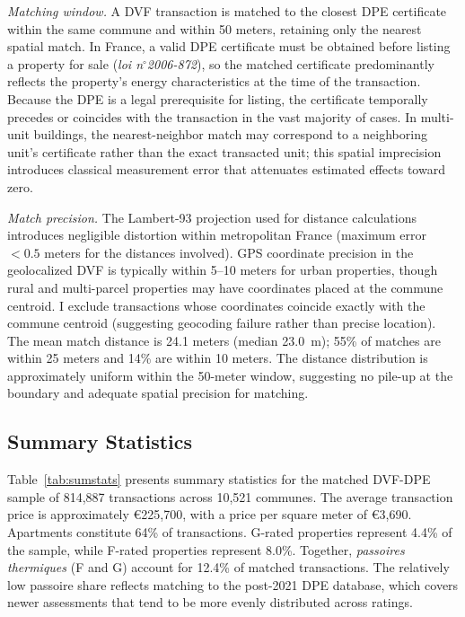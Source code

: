 \documentclass[12pt]{article}
\begin{document}
\textit{Matching window.} A DVF transaction is matched to the closest DPE certificate within the same commune and within 50 meters, retaining only the nearest spatial match. In France, a valid DPE certificate must be obtained before listing a property for sale (\textit{loi n$^{\circ}$2006-872}), so the matched certificate predominantly reflects the property's energy characteristics at the time of the transaction. Because the DPE is a legal prerequisite for listing, the certificate temporally precedes or coincides with the transaction in the vast majority of cases. In multi-unit buildings, the nearest-neighbor match may correspond to a neighboring unit's certificate rather than the exact transacted unit; this spatial imprecision introduces classical measurement error that attenuates estimated effects toward zero.

\textit{Match precision.} The Lambert-93 projection used for distance calculations introduces negligible distortion within metropolitan France (maximum error $< 0.5$ meters for the distances involved). GPS coordinate precision in the geolocalized DVF is typically within 5--10 meters for urban properties, though rural and multi-parcel properties may have coordinates placed at the commune centroid. I exclude transactions whose coordinates coincide exactly with the commune centroid (suggesting geocoding failure rather than precise location). The mean match distance is 24.1 meters (median 23.0~m); 55\% of matches are within 25 meters and 14\% are within 10 meters. The distance distribution is approximately uniform within the 50-meter window, suggesting no pile-up at the boundary and adequate spatial precision for matching.

\subsection{Summary Statistics}



Table~\ref{tab:sumstats} presents summary statistics for the matched DVF-DPE sample of 814,887 transactions across 10,521 communes. The average transaction price is approximately \euro{}225,700, with a price per square meter of \euro{}3,690. Apartments constitute 64\% of transactions. G-rated properties represent 4.4\% of the sample, while F-rated properties represent 8.0\%. Together, \textit{passoires thermiques} (F and G) account for 12.4\% of matched transactions. The relatively low passoire share reflects matching to the post-2021 DPE database, which covers newer assessments that tend to be more evenly distributed across ratings.
\end{document}

